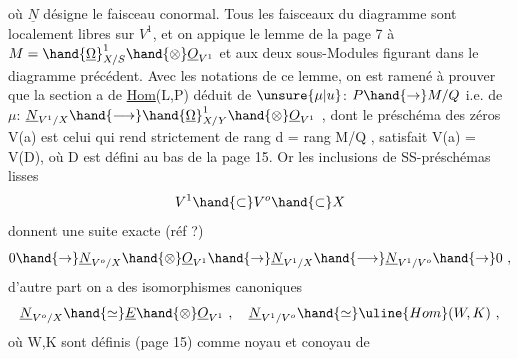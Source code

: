 où $\underline{N}$ désigne le faisceau conormal. Tous les faisceaux du diagramme sont
localement libres sur $V^1$, et on appique le lemme de la page 7 à $M=\hand{\underline{\Omega}}^1_{X/S}\hand{\otimes}\underline{O}_{V^1}$
et aux deux sous-Modules figurant dans le diagramme précédent. Avec
les notations de ce lemme, on est ramené à prouver que la section a
 de \uline{Hom}(L,P) déduit de $\unsure{\mu|u}$: $P\hand{\rightarrow} M/Q$ i.e. de $\mu$: $\underline{N}_{V^1/X}\hand{\longrightarrow}\hand{\underline{\Omega}}^1_{X/Y}\hand{\otimes}\underline{O}_{V^1}$ ,
dont le préschéma des zéros V(a) est celui qui rend \hand{$\mu$} strictement de rang
\hand{$<$} d = rang M/Q , satisfait V(a) = V(D), où D est défini au bas de la
page 15. Or les inclusions de SS-préschémas lisses
\placedmargin{||}
\[ V^1 \hand{\subset} V^o \hand{\subset} X \]
donnent une suite exacte (réf ?)
\[ 0 \hand{\rightarrow} \underline{N}_{V^o/X}\hand{\otimes}\underline{O}_{V^1} \hand{\rightarrow} \underline{N}_{V^1/X} \hand{\longrightarrow} \underline{N}_{V^1/V^o} \hand{\rightarrow} 0 \ , \]
d'autre part on a des isomorphismes canoniques
\[ \underline{N}_{V^o/X} \hand{\simeq} \underline{E}\hand{\otimes}\underline{O}_{V^1} \ , \quad \underline{N}_{V^1/V^o} \hand{\simeq} \uline{Hom}(W,K) \ , \]
où W,K sont définis (page 15) comme noyau et conoyau de

